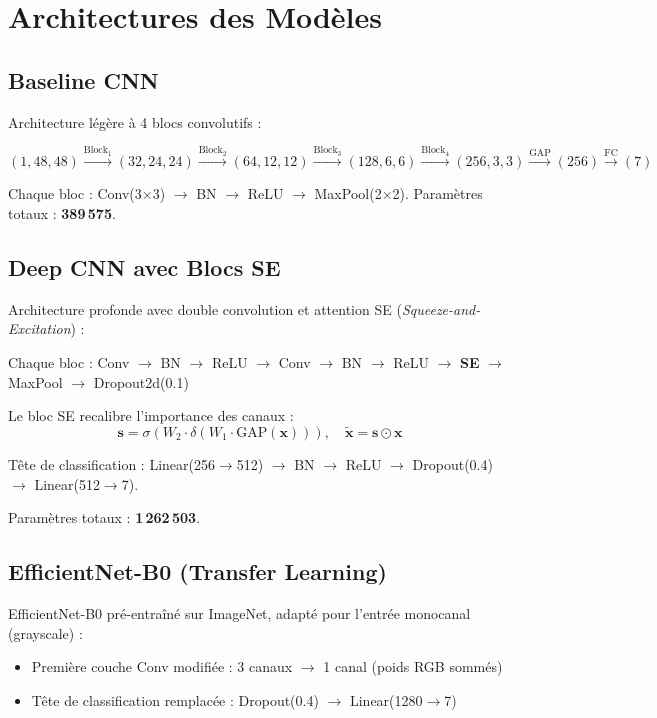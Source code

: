 \documentclass[12pt,a4paper]{article}
\begin{document}
\section{Architectures des Modèles}

\subsection{Baseline CNN}

Architecture légère à 4 blocs convolutifs :

\[
(1, 48, 48) \xrightarrow{\text{Block}_1} (32, 24, 24) \xrightarrow{\text{Block}_2} (64, 12, 12) \xrightarrow{\text{Block}_3} (128, 6, 6) \xrightarrow{\text{Block}_4} (256, 3, 3) \xrightarrow{\text{GAP}} (256) \xrightarrow{\text{FC}} (7)
\]

Chaque bloc : Conv(3$\times$3) $\rightarrow$ BN $\rightarrow$ ReLU $\rightarrow$ MaxPool(2$\times$2). Paramètres totaux : \textbf{389\,575}.

\subsection{Deep CNN avec Blocs SE}

Architecture profonde avec double convolution et attention SE (\textit{Squeeze-and-Excitation}) :

Chaque bloc : Conv $\rightarrow$ BN $\rightarrow$ ReLU $\rightarrow$ Conv $\rightarrow$ BN $\rightarrow$ ReLU $\rightarrow$ \textbf{SE} $\rightarrow$ MaxPool $\rightarrow$ Dropout2d(0.1)

Le bloc SE recalibre l'importance des canaux :
\[
\mathbf{s} = \sigma\left(W_2 \cdot \delta(W_1 \cdot \text{GAP}(\mathbf{x}))\right), \quad \tilde{\mathbf{x}} = \mathbf{s} \odot \mathbf{x}
\]

Tête de classification : Linear(256$\rightarrow$512) $\rightarrow$ BN $\rightarrow$ ReLU $\rightarrow$ Dropout(0.4) $\rightarrow$ Linear(512$\rightarrow$7).

Paramètres totaux : \textbf{1\,262\,503}.

\subsection{EfficientNet-B0 (Transfer Learning)}

EfficientNet-B0 pré-entraîné sur ImageNet, adapté pour l'entrée monocanal (grayscale) :
\begin{itemize}
    \item Première couche Conv modifiée : 3 canaux $\rightarrow$ 1 canal (poids RGB sommés)
    \item Tête de classification remplacée : Dropout(0.4) $\rightarrow$ Linear(1280$\rightarrow$7)
\end{itemize}
\end{document}
